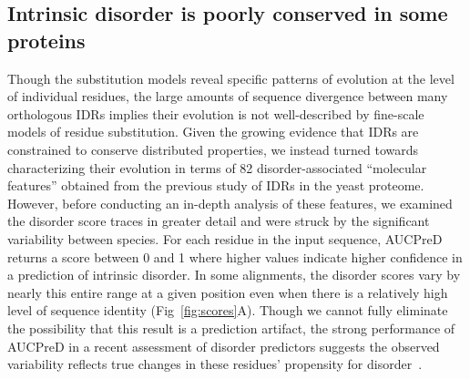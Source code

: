 \subsection{Intrinsic disorder is poorly conserved in some proteins}
Though the substitution models reveal specific patterns of evolution at the level of individual residues, the large amounts of sequence divergence between many orthologous IDRs implies their evolution is not well-described by fine-scale models of residue substitution. Given the growing evidence that IDRs are constrained to conserve distributed properties, we instead turned towards characterizing their evolution in terms of 82 disorder-associated ``molecular features'' obtained from the previous study of IDRs in the yeast proteome. However, before conducting an in-depth analysis of these features, we examined the disorder score traces in greater detail and were struck by the significant variability between species. For each residue in the input sequence, AUCPreD returns a score between 0 and 1 where higher values indicate higher confidence in a prediction of intrinsic disorder. In some alignments, the disorder scores vary by nearly this entire range at a given position even when there is a relatively high level of sequence identity (Fig~\ref{fig:scores}A). Though we cannot fully eliminate the possibility that this result is a prediction artifact, the strong performance of AUCPreD in a recent assessment of disorder predictors suggests the observed variability reflects true changes in these residues' propensity for disorder~\cite{Necci2021}.


